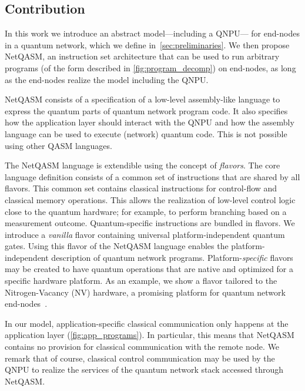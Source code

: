 \subsection{Contribution}


In this work we introduce an abstract model---including a \ac{QNPU}--- for end-nodes in a quantum network, which we define in~\cref{sec:preliminaries}.
We then propose \ac{NetQASM}, an instruction set architecture that can be used to run arbitrary programs (of the form described in \cref{fig:program_decomp}) on end-nodes, as long as the end-nodes realize the model including the QNPU.

\ac{NetQASM} consists of a specification of a low-level assembly-like language to express the quantum parts of quantum network program code.
It also specifies how the application layer should interact with the \ac{QNPU} and how the assembly language can be used to execute (network) quantum code.
This is not possible using other QASM languages.

The \ac{NetQASM} language is extendible using the concept of \textit{flavors}.
The core language definition consists of a common set of instructions that are shared by all flavors.
This common set contains classical instructions for control-flow and classical memory operations.
This allows the realization of low-level control logic close to the quantum hardware;
for example, to perform branching based on a measurement outcome.
Quantum-specific instructions are bundled in flavors.
We introduce a \textit{vanilla} flavor containing universal platform-independent quantum gates.
Using this flavor of the \ac{NetQASM} language enables the platform-independent description of quantum network programs.
Platform-\textit{specific} flavors may be created to have quantum operations that are native and optimized for a specific hardware platform.
As an example, we show a flavor tailored to the Nitrogen-Vacancy (NV) hardware, a promising platform for quantum network end-nodes~\cite{Taminiau2014, hanson2021realization}.

In our model, application-specific classical communication only happens at the application layer (\cref{fig:app_programs}).
In particular, this means that \ac{NetQASM} contains no provision for classical communication with the remote node.
We remark that of course, classical control communication may be used by the \ac{QNPU} to realize the services of the quantum network stack accessed through \ac{NetQASM}.

